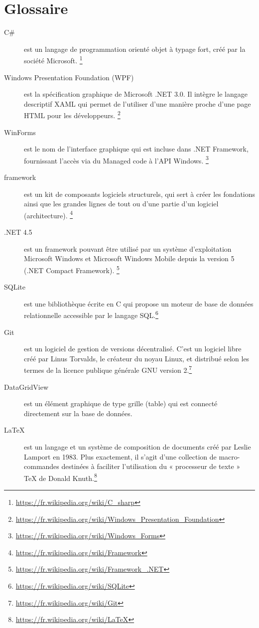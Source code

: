 \documentclass[letterpaper, oneside, 12pt, these, creativecommons]{thETS}
\begin{document}


\tableofcontents
\listoftables
\listoffigures

\chapter{Glossaire}

\begin{description}
\item[C\#] est un langage de programmation orienté objet à typage fort, créé par la société Microsoft. \footnote{\url{https://fr.wikipedia.org/wiki/C_sharp}}
\item[Windows Presentation Foundation (WPF)] est la spécification graphique de Microsoft .NET 3.0. Il intègre le langage descriptif XAML qui permet de l'utiliser d'une manière proche d'une page HTML pour les développeurs. \footnote{\url{https://fr.wikipedia.org/wiki/Windows_Presentation_Foundation}}
\item[WinForms] est le nom de l'interface graphique qui est incluse dans .NET Framework, fournissant l'accès via du Managed code à l'API Windows. \footnote{\url{https://fr.wikipedia.org/wiki/Windows_Forms}}
\item[framework] est un kit de composants logiciels structurels, qui sert à créer les fondations ainsi que les grandes lignes de tout ou d’une partie d'un logiciel (architecture). \footnote{\url{https://fr.wikipedia.org/wiki/Framework}}
\item[.NET 4.5] est un framework pouvant être utilisé par un système d'exploitation Microsoft Windows et Microsoft Windows Mobile depuis la version 5 (.NET Compact Framework). \footnote{\url{https://fr.wikipedia.org/wiki/Framework_.NET}}
\item[SQLite] est une bibliothèque écrite en C qui propose un moteur de base de données relationnelle accessible par le langage SQL.\footnote{\url{https://fr.wikipedia.org/wiki/SQLite}}
\item[Git] est un logiciel de gestion de versions décentralisé. C'est un logiciel libre créé par Linus Torvalds, le créateur du noyau Linux, et distribué selon les termes de la licence publique générale GNU version 2.\footnote{\url{https://fr.wikipedia.org/wiki/Git}}
\item[DataGridView] est un élément graphique de type grille (table) qui est connecté directement sur la base de données.
\item[\LaTeX] est un langage et un système de composition de documents créé par Leslie Lamport en 1983. Plus exactement, il s'agit d'une collection de macro-commandes destinées à faciliter l'utilisation du « processeur de texte » TeX de Donald Knuth.\footnote{\url{https://fr.wikipedia.org/wiki/LaTeX}}
\end{description}
\end{document}
